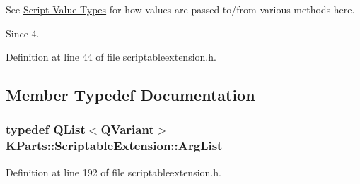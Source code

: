 \-See \hyperlink{group__ScriptValueTypes}{\-Script \-Value \-Types} for how values are passed to/from various methods here.

\begin{DoxySince}{\-Since}
4. 
\end{DoxySince}


\-Definition at line 44 of file scriptableextension.\-h.



\subsection{\-Member \-Typedef \-Documentation}
\hypertarget{classKParts_1_1ScriptableExtension_a6a35540990153f08b6dcf55d4b504c02}{
\subsubsection[{\-Arg\-List}]{\setlength{\rightskip}{0pt plus 5cm}typedef \-Q\-List$<$\-Q\-Variant$>$ {\bf \-K\-Parts\-::\-Scriptable\-Extension\-::\-Arg\-List}}}\label{classKParts_1_1ScriptableExtension_a6a35540990153f08b6dcf55d4b504c02}


\-Definition at line 192 of file scriptableextension.\-h.



